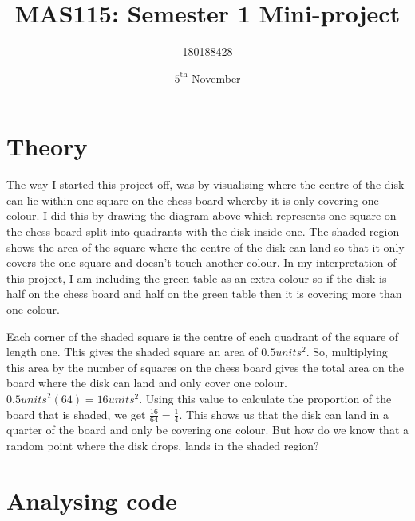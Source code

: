 \documentclass[11pt,a4paper]{amsart}
\title{MAS115: Semester 1 Mini-project}
\author{180188428}
\date{$5^{\text{th}}$ November}
\theoremstyle{plain}
\theoremstyle{definition}
\theoremstyle{remark}
\begin{document}
\maketitle

\section{Theory}


The way I started this project off, was by visualising where the centre of the disk can lie within one square on the chess board whereby it is only covering one colour. I did this by drawing the diagram above which represents one square on the chess board split into quadrants with the disk inside one. The shaded region shows the area of the square where the centre of the disk can land so that it only covers the one square and doesn't touch another colour. In my interpretation of this project, I am including the green table as an extra colour so if the disk is half on the chess board and half on the green table then it is covering more than one colour.

Each corner of the shaded square is the centre of each quadrant of the square of length one. This gives the shaded square an area of $0.5{units}^2$. So, multiplying this area by the number of squares on the chess board gives the total area on the board where the disk can land and only cover one colour. $0.5{units}^2(64) = 16units^2$. Using this value to calculate the proportion of the board that is shaded, we get $\frac{16}{64}=\frac{1}{4}$. This shows us that the disk can land in a quarter of the board and only be covering one colour. But how do we know that a random point where the disk drops, lands in the shaded region?

\section{Analysing code}
\end{document}
